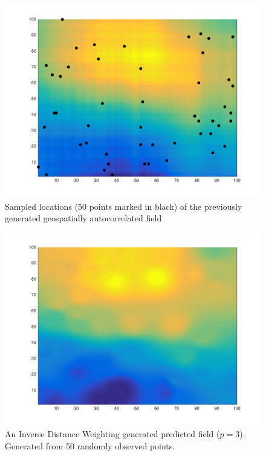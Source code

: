 \documentclass[11pt]{ucthesis}
\begin{document}
\begin{figure}[!htb]
    \captionsetup{skip=0.4\baselineskip,size=footnotesize}
    \centering
	\includegraphics[scale=0.5]{figures/sampled_generated_field.png}
    \caption{Sampled locations (50 points marked in black) of the previously generated geospatially autocorrelated field}
    \label{fig:sampled_field}
\end{figure}

\begin{figure}[!htb]
    \captionsetup{skip=0.4\baselineskip,size=footnotesize}
    \centering
	\includegraphics[scale=0.5]{figures/idw_predicted_field.png}
    \caption{An Inverse Distance Weighting generated predicted field ($p=3$). Generated from 50 randomly observed points.}
    \label{fig:idw_field}
\end{figure}
\end{document}
